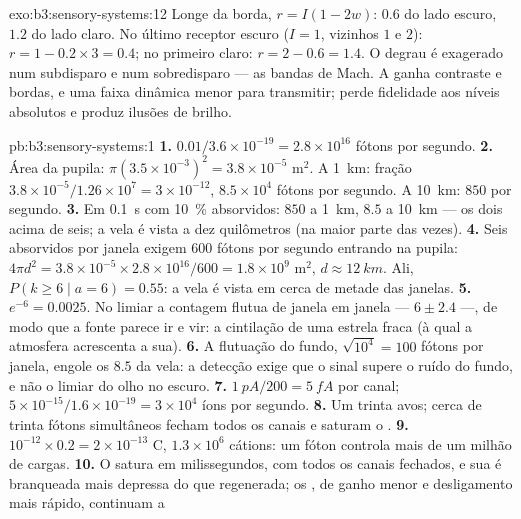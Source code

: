 \begin{solution}{exo:b3:sensory-systems:12}
Longe da borda, $r = I(1 - 2w)$: $0.6$ do lado escuro, $1.2$ do lado
claro. No último receptor escuro ($I = 1$, vizinhos $1$ e $2$): $r
= 1 - 0.2\times 3 = 0.4$; no primeiro claro: $r = 2 - 0.6 = 1.4$. O
degrau é exagerado num subdisparo e num sobredisparo --- as bandas de
Mach. A  ganha contraste e bordas, e uma faixa dinâmica menor para
transmitir; perde fidelidade aos níveis absolutos e produz ilusões de
brilho.
\end{solution}

\begin{solution}{pb:b3:sensory-systems:1}
\textbf{1.} $0.01/3.6\times 10^{-19} = 2.8\times 10^{16}$ fótons por
segundo.
\textbf{2.} Área da pupila: $\pi(3.5\times 10^{-3})^{2} = 3.8\times 10^{-5}$ m$^{2}$. A \qty{1}{km}: fração $3.8\times 10^{-5}/1.26\times 10^{7} =
3\times 10^{-12}$, $8.5\times 10^{4}$ fótons por segundo. A
\qty{10}{km}: $850$ por segundo.
\textbf{3.} Em \qty{0.1}{s} com \qty{10}{\%} absorvidos: $850$ a
\qty{1}{km}, $8.5$ a \qty{10}{km} --- os dois acima de seis; a vela é
vista a dez quilômetros (na maior parte das vezes).
\textbf{4.} Seis absorvidos por janela exigem $600$ fótons por segundo
entrando na pupila: $4\pi d^{2} = 3.8\times 10^{-5}\times 2.8\times 10^{16}/600
= 1.8\times 10^{9}$ m$^{2}$, $d \approx \qty{12}{km}$. Ali,
$P(k \ge
6 \mid a = 6) = 0.55$: a vela é vista em cerca de metade das
janelas.
\textbf{5.} $e^{-6} = 0.0025$. No limiar a contagem flutua de janela em
janela --- $6 \pm 2.4$ ---, de modo que a fonte parece ir e vir: a
cintilação de uma estrela fraca (à qual a atmosfera acrescenta a sua).
\textbf{6.} A flutuação do fundo, $\sqrt{10^{4}} = 100$ fótons por
janela, engole os $8.5$ da vela: a detecção exige que o sinal supere o
ruído do fundo, e não o limiar do olho no escuro.
\textbf{7.} $\qty{1}{pA}/200 = \qty{5}{fA}$ por canal; $5\times
10^{-15}/1.6\times 10^{-19} = 3\times 10^{4}$ íons por segundo.
\textbf{8.} Um trinta avos; cerca de trinta fótons simultâneos fecham
todos os canais e saturam o .
\textbf{9.} $10^{-12}\times 0.2 = 2\times 10^{-13}$ C, $1.3\times 10^{6}$
cátions: um fóton controla mais de um milhão de cargas.
\textbf{10.} O  satura em milissegundos, com todos os canais
fechados, e sua  é branqueada mais depressa do que regenerada;
os , de ganho menor e desligamento mais rápido, continuam a

\end{solution}
